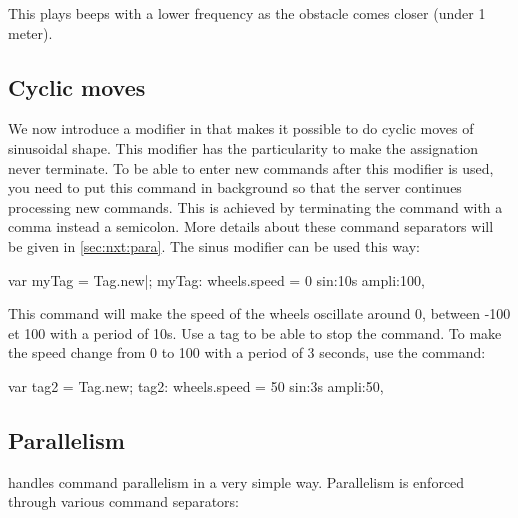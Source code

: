 This plays beeps with a lower frequency as the obstacle comes closer (under
1 meter).

\subsection{Cyclic moves}
We now introduce a modifier in \urbi that makes it possible to do cyclic
moves of sinusoidal shape. This modifier has the particularity to make the
assignation never terminate. To be able to enter new commands after this
modifier is used, you need to put this command in background so that the
\urbi server continues processing new commands. This is achieved by
terminating the command with a comma instead a semicolon. More details about
these command separators will be given in \autoref{sec:nxt:para}.  The sinus
modifier can be used this way:
\begin{urbiunchecked}
var myTag = Tag.new|;
myTag: wheels.speed = 0 sin:10s ampli:100,
\end{urbiunchecked}

This command will make the speed of the wheels oscillate around 0, between -100
et 100 with a period of 10s. Use a tag to be able to stop the command. To make
the speed change from 0 to 100 with a period of 3 seconds, use the command:
\begin{urbiunchecked}
var tag2 = Tag.new;
tag2: wheels.speed = 50 sin:3s ampli:50,
\end{urbiunchecked}



\subsection{Parallelism}
\label{sec:nxt:para}
\urbi handles command parallelism in a very simple way. Parallelism is enforced
through various command separators:


